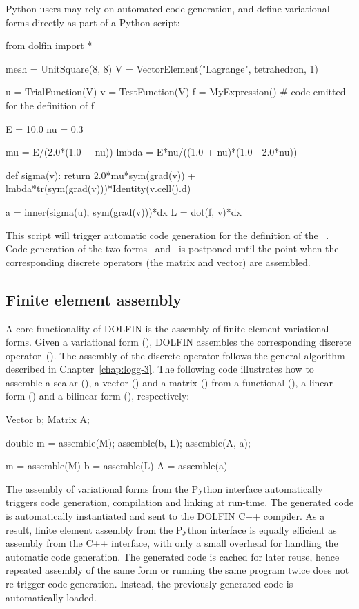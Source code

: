 Python users may rely on automated code generation, and define variational
forms directly as part of a Python script:
\begin{python}
from dolfin import *

mesh = UnitSquare(8, 8)
V = VectorElement("Lagrange", tetrahedron, 1)

u = TrialFunction(V)
v = TestFunction(V)
f = MyExpression() # code emitted for the definition of f

E  = 10.0
nu = 0.3

mu    = E/(2.0*(1.0 + nu))
lmbda = E*nu/((1.0 + nu)*(1.0 - 2.0*nu))

def sigma(v):
    return 2.0*mu*sym(grad(v)) + lmbda*tr(sym(grad(v)))*Identity(v.cell().d)

a = inner(sigma(u), sym(grad(v)))*dx
L = dot(f, v)*dx
\end{python}
This script will trigger automatic code generation for the definition
of the ~. Code generation of the two
forms~ and~ is postponed until the point when the
corresponding discrete operators (the matrix and vector) are
assembled.

\subsection{Finite element assembly}

A core functionality of DOLFIN is the assembly of finite element
variational forms. Given a variational form (), DOLFIN assembles
the corresponding discrete operator~(). The assembly of the
discrete operator follows the general algorithm described in
Chapter~\ref{chap:logg-3}. The following code illustrates how to
assemble a scalar (), a vector () and a matrix ()
from a functional (), a linear form () and a bilinear
form (), respectively:
\begin{c++}
Vector b;
Matrix A;

double m = assemble(M);
assemble(b, L);
assemble(A, a);
\end{c++}
\begin{python}
m = assemble(M)
b = assemble(L)
A = assemble(a)
\end{python}
The assembly of variational forms from the Python interface
automatically triggers code generation, compilation and linking at
run-time. The generated code is automatically instantiated and sent to
the DOLFIN C++ compiler. As a result, finite element assembly from the
Python interface is equally efficient as assembly from the C++
interface, with only a small overhead for handling the automatic code
generation. The generated code is cached for later reuse, hence
repeated assembly of the same form or running the same program twice
does not re-trigger code generation. Instead, the previously generated
code is automatically loaded.

